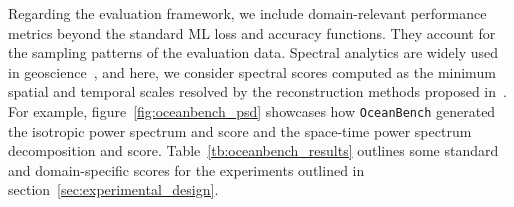 



Regarding the evaluation framework, we include domain-relevant performance metrics beyond the standard ML loss and accuracy functions. They account for the sampling patterns of the evaluation data. Spectral analytics are widely used in geoscience~\cite{BFNQG}, and here, we consider spectral scores computed as the minimum spatial and temporal scales resolved by the reconstruction methods proposed in~\cite{BFNQG}.
For example, figure~\ref{fig:oceanbench_psd} showcases how \texttt{OceanBench} generated the isotropic power spectrum and score and the space-time power spectrum decomposition and score.
Table~\ref{tb:oceanbench_results} outlines some standard and domain-specific scores for the experiments outlined in section~\ref{sec:experimental_design}.


